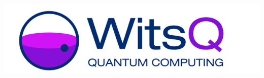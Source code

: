 \documentclass[a0,portrait]{a0poster}
\begin{document}
\begin{minipage}[t]{0.12\linewidth}%
\includegraphics[width=\linewidth]{Wits-Q-logo.png}%
\end{minipage}%

\vspace{1.5cm}%

\end{document}
